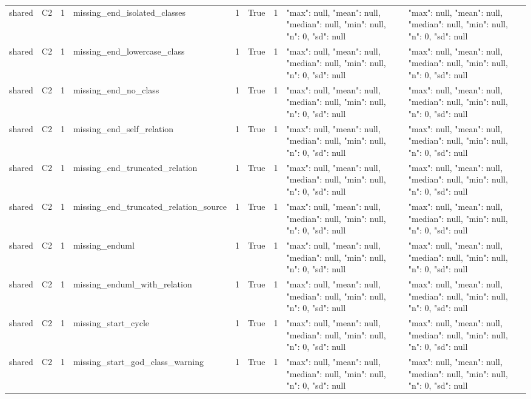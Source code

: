 \begin{tabular}{lllllllll}
shared & C2 & 1 & missing\_end\_isolated\_classes & 1 & True & 1 & {"max": null, "mean": null, "median": null, "min": null, "n": 0, "sd": null} & {"max": null, "mean": null, "median": null, "min": null, "n": 0, "sd": null} \\
shared & C2 & 1 & missing\_end\_lowercase\_class & 1 & True & 1 & {"max": null, "mean": null, "median": null, "min": null, "n": 0, "sd": null} & {"max": null, "mean": null, "median": null, "min": null, "n": 0, "sd": null} \\
shared & C2 & 1 & missing\_end\_no\_class & 1 & True & 1 & {"max": null, "mean": null, "median": null, "min": null, "n": 0, "sd": null} & {"max": null, "mean": null, "median": null, "min": null, "n": 0, "sd": null} \\
shared & C2 & 1 & missing\_end\_self\_relation & 1 & True & 1 & {"max": null, "mean": null, "median": null, "min": null, "n": 0, "sd": null} & {"max": null, "mean": null, "median": null, "min": null, "n": 0, "sd": null} \\
shared & C2 & 1 & missing\_end\_truncated\_relation & 1 & True & 1 & {"max": null, "mean": null, "median": null, "min": null, "n": 0, "sd": null} & {"max": null, "mean": null, "median": null, "min": null, "n": 0, "sd": null} \\
shared & C2 & 1 & missing\_end\_truncated\_relation\_source & 1 & True & 1 & {"max": null, "mean": null, "median": null, "min": null, "n": 0, "sd": null} & {"max": null, "mean": null, "median": null, "min": null, "n": 0, "sd": null} \\
shared & C2 & 1 & missing\_enduml & 1 & True & 1 & {"max": null, "mean": null, "median": null, "min": null, "n": 0, "sd": null} & {"max": null, "mean": null, "median": null, "min": null, "n": 0, "sd": null} \\
shared & C2 & 1 & missing\_enduml\_with\_relation & 1 & True & 1 & {"max": null, "mean": null, "median": null, "min": null, "n": 0, "sd": null} & {"max": null, "mean": null, "median": null, "min": null, "n": 0, "sd": null} \\
shared & C2 & 1 & missing\_start\_cycle & 1 & True & 1 & {"max": null, "mean": null, "median": null, "min": null, "n": 0, "sd": null} & {"max": null, "mean": null, "median": null, "min": null, "n": 0, "sd": null} \\
shared & C2 & 1 & missing\_start\_god\_class\_warning & 1 & True & 1 & {"max": null, "mean": null, "median": null, "min": null, "n": 0, "sd": null} & {"max": null, "mean": null, "median": null, "min": null, "n": 0, "sd": null} \\

\end{tabular}
